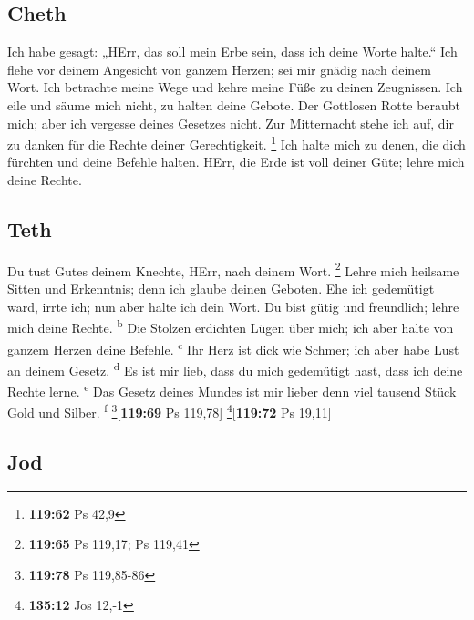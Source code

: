 \hypertarget{cheth}{%
\subsection{Cheth}\label{cheth}}

 Ich habe gesagt: „HErr, das soll mein Erbe sein, dass
ich deine Worte halte.``  Ich flehe vor deinem Angesicht
von ganzem Herzen; sei mir gnädig nach deinem Wort.  Ich
betrachte meine Wege und kehre meine Füße zu deinen Zeugnissen.
 Ich eile und säume mich nicht, zu halten deine Gebote.
 Der Gottlosen Rotte beraubt mich; aber ich vergesse
deines Gesetzes nicht.  Zur Mitternacht stehe ich auf,
dir zu danken für die Rechte deiner Gerechtigkeit. \footnote{\textbf{119:62}
  Ps 42,9}  Ich halte mich zu denen, die dich fürchten
und deine Befehle halten.  HErr, die Erde ist voll deiner
Güte; lehre mich deine Rechte.

\hypertarget{teth}{%
\subsection{Teth}\label{teth}}

 Du tust Gutes deinem Knechte, HErr, nach deinem Wort.
\footnote{\textbf{119:65} Ps 119,17; Ps 119,41}  Lehre
mich heilsame Sitten und Erkenntnis; denn ich glaube deinen Geboten.
 Ehe ich gedemütigt ward, irrte ich; nun aber halte ich
dein Wort.  Du bist gütig und freundlich; lehre mich
deine Rechte. \textsuperscript{b}  Die Stolzen erdichten
Lügen über mich; ich aber halte von ganzem Herzen deine Befehle.
\textsuperscript{c}  Ihr Herz ist dick wie Schmer; ich
aber habe Lust an deinem Gesetz. \textsuperscript{d}  Es
ist mir lieb, dass du mich gedemütigt hast, dass ich deine Rechte lerne.
\textsuperscript{e}  Das Gesetz deines Mundes ist mir
lieber denn viel tausend Stück Gold und Silber. \textsuperscript{f}
\footnote{\textbf{119:78} Ps 119,85-86}{[}\textbf{119:69} Ps 119,78{]}
\footnote{\textbf{135:12} Jos 12,-1}{[}\textbf{119:72} Ps 19,11{]}

\hypertarget{jod}{%
\subsection{Jod}\label{jod}}

